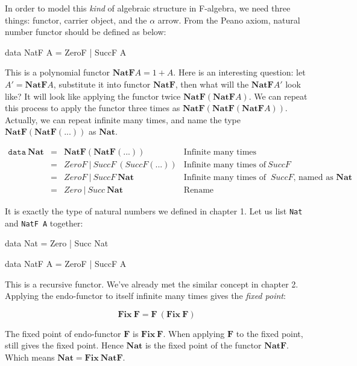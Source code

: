 \documentclass[b5paper]{article}
\begin{document}
In order to model this {\em kind} of algebraic structure in F-algebra, we need three things: functor, carrier object, and the $\alpha$ arrow. From the Peano axiom, natural number functor should be defined as below:

\begin{Haskell}[frame=none]
data NatF A = ZeroF | SuccF A
\end{Haskell}

This is a polynomial functor $\mathbf{NatF} A = 1 + A$. Here is an interesting question: let $A' = \mathbf{NatF} A$, substitute it into functor $\mathbf{NatF}$, then what will the $\mathbf{NatF} A'$ look like? It will look like applying the functor twice $\mathbf{NatF}(\mathbf{NatF} A)$. We can repeat this process to apply the functor three times as $\mathbf{NatF}(\mathbf{NatF}(\mathbf{NatF} A))$. Actually, we can repeat infinite many times, and name the type $\mathbf{NatF}(\mathbf{NatF}(...))$ as $\mathbf{Nat}$.

\[
\begin{array}{rcll}
\texttt{data}\ \mathbf{Nat} & = & \mathbf{NatF}(\mathbf{NatF}(...)) & \text{Infinite many times} \\
         & = & ZeroF\ |\ SuccF\ (SuccF (...)) & \text{Infinite many times of}\ SuccF \\
         & = & ZeroF\ |\ SuccF\ \mathbf{Nat} & \text{Infinite many times of }\ SuccF \text{, named as }\mathbf{Nat} \\
         & = & Zero\ |\ Succ\ \mathbf{Nat} & \text{Rename}
\end{array}
\]

It is exactly the type of natural numbers we defined in chapter 1. Let us list \texttt{Nat} and \texttt{NatF A} together:

\begin{Haskell}[frame = none]
data Nat = Zero | Succ Nat

data NatF A = ZeroF | SuccF A
\end{Haskell}

This is a recursive functor. We've already met the similar concept in chapter 2. Applying the endo-functor to itself infinite many times gives the {\em fixed point}:

\[
\mathbf{Fix}\ \mathbf{F} = \mathbf{F}\ (\mathbf{Fix}\ \mathbf{F})
\]

The fixed point of endo-functor $\mathbf{F}$ is $\mathbf{Fix}\ \mathbf{F}$. When applying $\mathbf{F}$ to the fixed point, still gives the fixed point. Hence $\mathbf{Nat}$ is the fixed point of the functor $\mathbf{NatF}$. Which means $\mathbf{Nat} = \mathbf{Fix}\ \mathbf{NatF}$.
\end{document}
